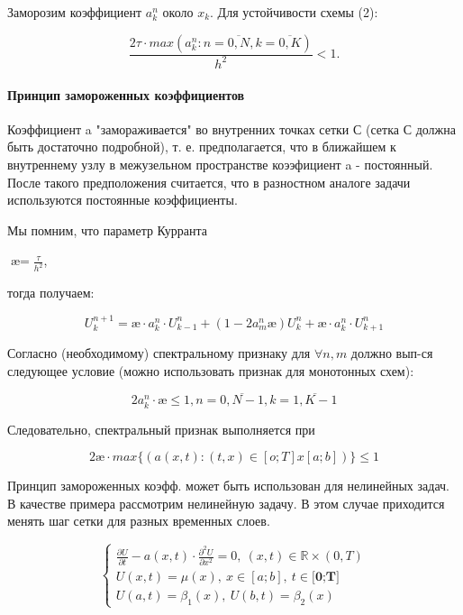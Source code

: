 \documentclass[__main__.tex]{subfiles}
\begin{document}
Заморозим коэффициент $a^n_k$ около $x_k$. Для устойчивости схемы (2):

$$
\frac{2\tau \cdot max ({a^n_k: n = \overline{0,N}, k = \overline{0,K}})}{h^2} < 1.
$$

\paragraph{Принцип замороженных коэффициентов}

Коэффициент a "замораживается" во внутренних точках сетки С (сетка С должна быть достаточно подробной), т. е. предполагается, что в ближайшем к внутреннему узлу в межузельном пространстве коээфициент a - постоянный. После такого предположения считается, что в разностном аналоге задачи используются постоянные коэффициенты.

Мы помним, что параметр Курранта 


$\text{\ae} = $$\frac{\tau}{h^2}$, 

тогда получаем:

\begin{equation} \label{42.3}
U^{n+1}_k = \text{\ae} \cdot a^n_k \cdot U^n_{k-1} + (1 - 2a^n_m \text{\ae})U^n_k + \text{\ae} \cdot a^n_k \cdot U^n_{k+1}
\end{equation}

Согласно (необходимому) спектральному признаку для $\forall n, m$ должно вып-ся следующее условие (можно использовать признак для монотонных схем):

\begin{equation} \label{42.4}
2a^n_k \cdot \text{\ae} \leq 1,  n = \overline{0,N-1},  k = \overline{1,K-1}
\end{equation}

Следовательно, спектральный признак выполняется при

\begin{equation} \label{42.5}
2 \text{\ae} \cdot max \{( a(x,t): (t,x) \in[o;T] x [a;b])\} \leq 1
\end{equation}

Принцип замороженных коэфф. может быть использован для нелинейных задач. В качестве примера рассмотрим нелинейную задачу. В этом случае приходится менять шаг сетки для разных временных слоев.

\begin{equation} \label{42.6}
\begin{cases}
\frac{\partial U}{\partial t} - a(x,t) \cdot \frac{\partial^2 U}{\partial x^2} = 0, \ \left(x,t\right) \in \mathbb{R} \times \left(0,T\right) \\
U(x,t) = \mu(x), \ x\in [a;b], \ t \in \textbf{[0;T]} \\
U(a,t) = \beta_1(x), \ U(b,t) = \beta_2(x)
\end{cases}
\end{equation}
\end{document}

